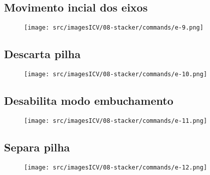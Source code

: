 \newpage
\thispagestyle{fancy}
\vspace*{40 pt}
\subsection{\small {Movimento incial dos eixos}}
\vspace*{\fill}
\begin{figure}[h]
    \centering
    \texttt{[image: src/imagesICV/08-stacker/commands/e-9.png]}
\end{figure}
\vspace*{\fill}

\newpage
\thispagestyle{fancy}
\vspace*{40 pt}
\subsection{\small {Descarta pilha}}
\vspace*{\fill}
\begin{figure}[h]
    \centering
    \texttt{[image: src/imagesICV/08-stacker/commands/e-10.png]}
\end{figure}
\vspace*{\fill}

\newpage
\thispagestyle{fancy}
\vspace*{40 pt}
\subsection{\small {Desabilita modo embuchamento}}
\vspace*{\fill}
\begin{figure}[h]
    \centering
    \texttt{[image: src/imagesICV/08-stacker/commands/e-11.png]}
\end{figure}
\vspace*{\fill}

\newpage
\thispagestyle{fancy}
\vspace*{40 pt}
\subsection{\small {Separa pilha}}
\vspace*{\fill}
\begin{figure}[h]
    \centering
    \texttt{[image: src/imagesICV/08-stacker/commands/e-12.png]}
\end{figure}
\vspace*{\fill}

